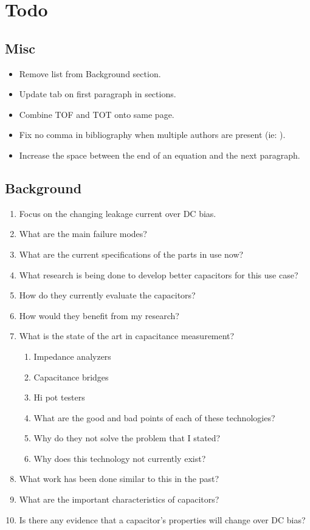 \documentclass{article}
\begin{document}
\section{Todo}

\subsection{Misc}
\begin{itemize}
    \item Remove list from Background section.
    \item Update tab on first paragraph in sections.
    \item Combine TOF and TOT onto same page.
    \item Fix no comma in bibliography when multiple authors are present (ie: \cite{absCircuit}).
    \item Increase the space between the end of an equation and the next paragraph.
\end{itemize}

\subsection{Background}
\begin {enumerate}
    \item Focus on the changing leakage current over DC bias.
    \item What are the main failure modes?
    \item What are the current specifications of the parts in use now?
    \item What research is being done to develop better capacitors for this use case?
    \item How do they currently evaluate the capacitors?
    \item How would they benefit from my research?
    \item What is the state of the art in capacitance measurement?
    \begin {enumerate}
        \item Impedance analyzers
        \item Capacitance bridges
        \item Hi pot testers
        \item What are the good and bad points of each of these technologies?
        \item Why do they not solve the problem that I stated? 
        \item Why does this technology not currently exist?
    \end {enumerate}
    \item What work has been done similar to this in the past?
    \item What are the important characteristics of capacitors?
    \item Is there any evidence that a capacitor's properties will change over DC bias?
\end {enumerate}
\end{document}
